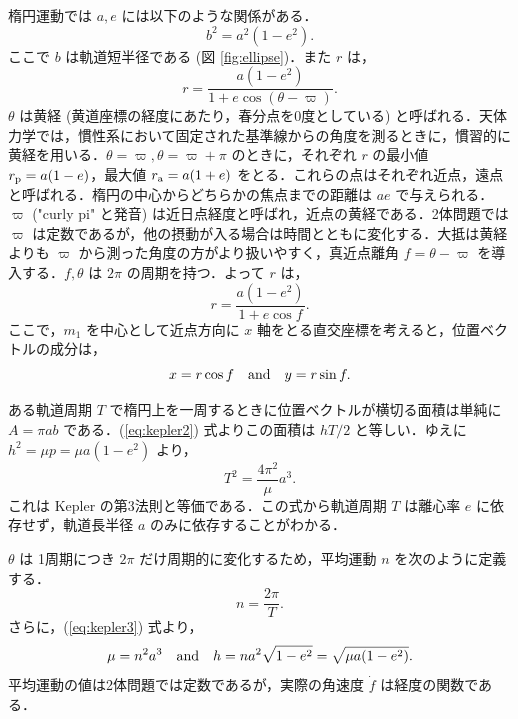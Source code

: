 \documentclass[11pt,a4paper,oneside,onecolumn]{jreport}
\begin{document}
楕円運動では $a, e$ には以下のような関係がある．
\begin{equation}
b^2 = a^2 (1 - e^2).
\end{equation}
ここで $b$ は軌道短半径である (図 \ref{fig:ellipse})．また $r$ は，
\begin{equation}
r =\frac{a (1 - e^2)}{1+ e \cos (\theta - \varpi)}.
\end{equation}
$\theta$ は黄経 (黄道座標の経度にあたり，春分点を0度としている) と呼ばれる．天体力学では，慣性系において固定された基準線からの角度を測るときに，慣習的に黄経を用いる．$\theta = \varpi, \theta = \varpi + \pi$ のときに，それぞれ $r$ の最小値 $r_{\rm p} = a (1 - e)$，最大値 $r_{\rm a} = a (1 + e)$ をとる．これらの点はそれぞれ近点，遠点と呼ばれる．楕円の中心からどちらかの焦点までの距離は $a e$ で与えられる．$\varpi$ ("curly pi" と発音) は近日点経度と呼ばれ，近点の黄経である．2体問題では $\varpi$ は定数であるが，他の摂動が入る場合は時間とともに変化する．大抵は黄経よりも $\varpi$ から測った角度の方がより扱いやすく，真近点離角 $f = \theta - \varpi$ を導入する．$f, \theta$ は $2 \pi$ の周期を持つ．よって $r$ は，
\begin{equation}
r = \frac{a (1 - e^2)}{1+ e \cos f}. \label{eq:rf}
\end{equation}
ここで，$m_1$ を中心として近点方向に $x$ 軸をとる直交座標を考えると，位置ベクトルの成分は，
\begin{equation}
x = r \cos f \quad {\rm and} \quad y = r \sin f. \label{eq:xy}
\end{equation}

ある軌道周期 $T$ で楕円上を一周するときに位置ベクトルが横切る面積は単純に $A = \pi a b$ である．(\ref{eq:kepler2}) 式よりこの面積は $h T / 2$ と等しい．ゆえに $h^2 = \mu p = \mu a (1 - e^2)$ より，
\begin{equation}
T^2 = \frac{4 \pi^2}{\mu} a^3. \label{eq:kepler3}
\end{equation}
これは Kepler の第3法則と等価である．この式から軌道周期 $T$ は離心率 $e$ に依存せず，軌道長半径 $a$ のみに依存することがわかる．

$\theta$ は 1周期につき $2 \pi$ だけ周期的に変化するため，平均運動 $n$ を次のように定義する．
\begin{equation}
n = \frac{2 \pi}{T}. \label{eq:n}
\end{equation}
さらに，(\ref{eq:kepler3}) 式より，
\begin{equation}
\mu = n^2 a^3 \quad {\rm and} \quad h = n a^2 \sqrt{1 - e^2} = \sqrt{\mu a (1 - e^2)}. \label{eq:mu}
\end{equation}
平均運動の値は2体問題では定数であるが，実際の角速度 $\dot{f}$ は経度の関数である．
\end{document}
